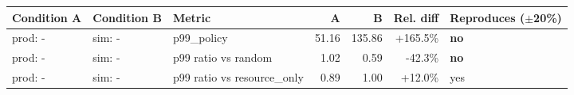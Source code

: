 \begin{tabular}{lllrrrl}
\toprule
Condition A & Condition B & Metric & A & B & Rel. diff & Reproduces ($\pm$20\%) \\
\midrule
prod: - & sim: - & p99\_policy & 51.16 & 135.86 & +165.5\% & \textbf{no} \\
prod: - & sim: - & p99 ratio vs random & 1.02 & 0.59 & -42.3\% & \textbf{no} \\
prod: - & sim: - & p99 ratio vs resource\_only & 0.89 & 1.00 & +12.0\% & yes \\
\bottomrule
\end{tabular}
